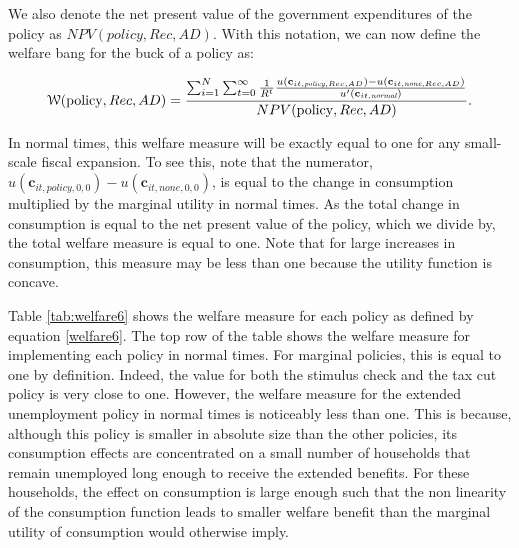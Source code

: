 \documentclass[../HAFiscal]{subfiles}
\begin{document}
We also denote the net present value of the government expenditures of the policy as $NPV(\textit{policy},Rec,AD)$.
With this notation, we can now define the welfare bang for the buck of a policy as:

\begin{equation}
  \begin{gathered}
    \begin{aligned}
      \label{welfare6}
      \mathcal{W}(\text{policy},Rec,AD) =\frac{\sum_{i=1}^{N} \sum_{t=0}^{\infty} \frac{1}{R^t} \frac{u(\mathbf{c}_{it,\textit{policy},Rec,AD}) - u(\mathbf{c}_{it,\textit{none},Rec,AD})}{ u'(\mathbf{c}_{it,\textit{normal}})}}{NPV(\text{policy},Rec,AD)}.
    \end{aligned}
  \end{gathered}
\end{equation}

In normal times, this welfare measure will be exactly equal to one for any small-scale fiscal expansion.
To see this, note that the numerator,  $u(\mathbf{c}_{it,\textit{policy},0,0}) - u(\mathbf{c}_{it,\textit{none},0,0})$, is equal to the change in consumption multiplied by the marginal utility in normal times.
As the total change in consumption is equal to the net present value of the policy, which we divide by, the total welfare measure is equal to one.
Note that for large increases in consumption, this measure may be less than one because the utility function is concave.



Table \ref{tab:welfare6} shows the welfare measure for each policy as defined by equation \eqref{welfare6}.
The top row of the table shows the welfare measure for implementing each policy in normal times.
For marginal policies, this is equal to one by definition.
Indeed, the value for both the stimulus check and the tax cut policy is very close to one.
However, the welfare measure for the extended unemployment policy in normal times is noticeably less than one.
This is because, although this policy is smaller in absolute size than the other policies, its consumption effects are concentrated on a small number of households that remain unemployed long enough to receive the extended benefits.
For these households, the effect on consumption is large enough such that the non linearity of the consumption function leads to smaller welfare benefit than the marginal utility of consumption would otherwise imply.
\end{document}
